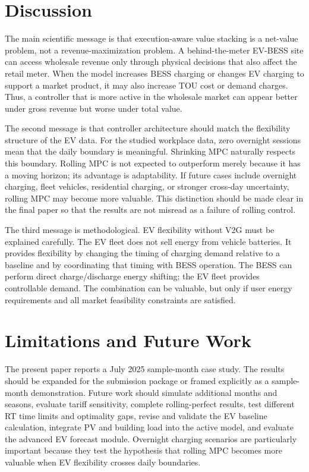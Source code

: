 \documentclass[final,5p,times]{elsarticle}
\begin{document}
\section{Discussion}
\label{sec:discussion}

The main scientific message is that execution-aware value stacking is a net-value problem, not a revenue-maximization problem. A behind-the-meter EV-BESS site can access wholesale revenue only through physical decisions that also affect the retail meter. When the model increases BESS charging or changes EV charging to support a market product, it may also increase TOU cost or demand charges. Thus, a controller that is more active in the wholesale market can appear better under gross revenue but worse under total value.

The second message is that controller architecture should match the flexibility structure of the EV data. For the studied workplace data, zero overnight sessions mean that the daily boundary is meaningful. Shrinking MPC naturally respects this boundary. Rolling MPC is not expected to outperform merely because it has a moving horizon; its advantage is adaptability. If future cases include overnight charging, fleet vehicles, residential charging, or stronger cross-day uncertainty, rolling MPC may become more valuable. This distinction should be made clear in the final paper so that the results are not misread as a failure of rolling control.

The third message is methodological. EV flexibility without V2G must be explained carefully. The EV fleet does not sell energy from vehicle batteries. It provides flexibility by changing the timing of charging demand relative to a baseline and by coordinating that timing with BESS operation. The BESS can perform direct charge/discharge energy shifting; the EV fleet provides controllable demand. The combination can be valuable, but only if user energy requirements and all market feasibility constraints are satisfied.

\section{Limitations and Future Work}
\label{sec:limitations}

The present paper reports a July 2025 sample-month case study. The results should be expanded for the submission package or framed explicitly as a sample-month demonstration. Future work should simulate additional months and seasons, evaluate tariff sensitivity, complete rolling-perfect results, test different RT time limits and optimality gaps, revise and validate the EV baseline calculation, integrate PV and building load into the active model, and evaluate the advanced EV forecast module. Overnight charging scenarios are particularly important because they test the hypothesis that rolling MPC becomes more valuable when EV flexibility crosses daily boundaries.
\end{document}
